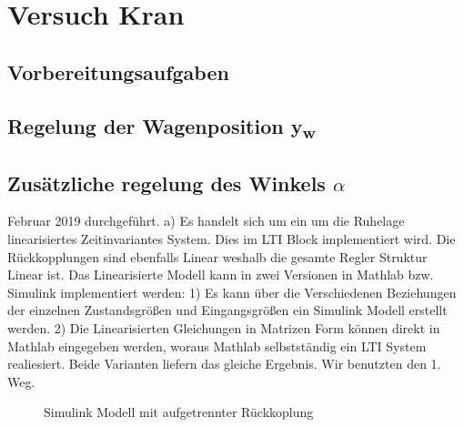 \documentclass[10pt]{scrartcl}
\begin{document}
\section{Versuch Kran}
\subsection{Vorbereitungsaufgaben}
\subsection{Regelung der Wagenposition y\textsubscript{w}}
\subsection{Zusätzliche regelung des Winkels $\alpha$ }
Februar 2019 durchgeführt.
a)	Es handelt sich um ein um die Ruhelage linearisiertes Zeitinvariantes System. Dies im LTI Block implementiert wird. Die Rückkopplungen sind ebenfalls Linear weshalb die gesamte Regler Struktur Linear ist.
Das Linearisierte Modell kann in zwei Versionen in Mathlab bzw. Simulink implementiert werden:
1) Es kann über die Verschiedenen Beziehungen der einzelnen Zustandsgrößen und Eingangsgrößen ein Simulink Modell erstellt werden.
2) Die Linearisierten Gleichungen in Matrizen Form können direkt in Mathlab eingegeben werden, woraus Mathlab selbstständig ein LTI System realiesiert. 
Beide Varianten liefern das gleiche Ergebnis.
Wir benutzten den 1. Weg. 
\begin{figure} 
\caption{Simulink Modell mit aufgetrennter Rückkoplung} 
\end{figure}
\end{document}
